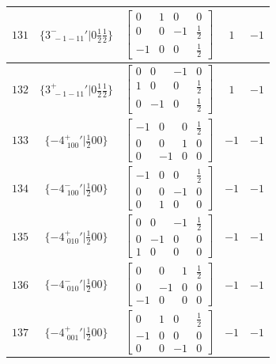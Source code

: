 \documentclass[fleqn,8pt]{jsarticle}
\begin{document}
\begin{longtable}{ccccc}
$ 131 $ & $ \{3^{-}_{\,\,-1-11}{}'|0 \frac{1}{2} \frac{1}{2}\} $ & $ \begin{bmatrix} 0 & 1 & 0 & 0 \\ 0 & 0 & -1 & \frac{1}{2} \\ -1 & 0 & 0 & \frac{1}{2} \end{bmatrix} $ & $ 1 $ & $ -1 $ \\ \hline
$ 132 $ & $ \{3^{+}_{\,\,-1-11}{}'|0 \frac{1}{2} \frac{1}{2}\} $ & $ \begin{bmatrix} 0 & 0 & -1 & 0 \\ 1 & 0 & 0 & \frac{1}{2} \\ 0 & -1 & 0 & \frac{1}{2} \end{bmatrix} $ & $ 1 $ & $ -1 $ \\ \hline
$ 133 $ & $ \{-4^{+}_{\,\,100}{}'|\frac{1}{2} 0 0\} $ & $ \begin{bmatrix} -1 & 0 & 0 & \frac{1}{2} \\ 0 & 0 & 1 & 0 \\ 0 & -1 & 0 & 0 \end{bmatrix} $ & $ -1 $ & $ -1 $ \\ \hline
$ 134 $ & $ \{-4^{-}_{\,\,100}{}'|\frac{1}{2} 0 0\} $ & $ \begin{bmatrix} -1 & 0 & 0 & \frac{1}{2} \\ 0 & 0 & -1 & 0 \\ 0 & 1 & 0 & 0 \end{bmatrix} $ & $ -1 $ & $ -1 $ \\ \hline
$ 135 $ & $ \{-4^{+}_{\,\,010}{}'|\frac{1}{2} 0 0\} $ & $ \begin{bmatrix} 0 & 0 & -1 & \frac{1}{2} \\ 0 & -1 & 0 & 0 \\ 1 & 0 & 0 & 0 \end{bmatrix} $ & $ -1 $ & $ -1 $ \\ \hline
$ 136 $ & $ \{-4^{-}_{\,\,010}{}'|\frac{1}{2} 0 0\} $ & $ \begin{bmatrix} 0 & 0 & 1 & \frac{1}{2} \\ 0 & -1 & 0 & 0 \\ -1 & 0 & 0 & 0 \end{bmatrix} $ & $ -1 $ & $ -1 $ \\ \hline
$ 137 $ & $ \{-4^{+}_{\,\,001}{}'|\frac{1}{2} 0 0\} $ & $ \begin{bmatrix} 0 & 1 & 0 & \frac{1}{2} \\ -1 & 0 & 0 & 0 \\ 0 & 0 & -1 & 0 \end{bmatrix} $ & $ -1 $ & $ -1 $ \\ \hline

\end{longtable}
\end{document}
